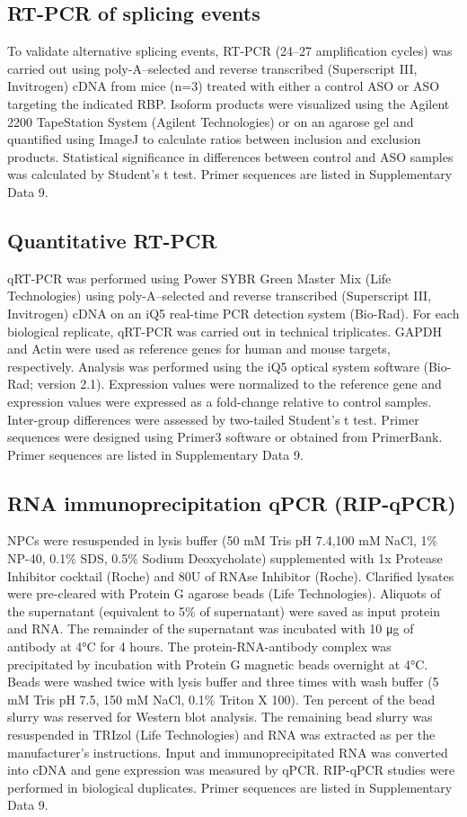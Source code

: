 \subsection{RT-PCR of splicing events}
To validate alternative splicing events, RT-PCR (24–27 amplification cycles) was carried out using poly-A–selected and reverse transcribed (Superscript III, Invitrogen) cDNA from mice (n=3) treated with either a control ASO or ASO targeting the indicated RBP. Isoform products were visualized using the Agilent 2200 TapeStation System (Agilent Technologies) or on an agarose gel and quantified using ImageJ to calculate ratios between inclusion and exclusion products. Statistical significance in differences between control and ASO samples was calculated by Student’s t test. Primer sequences are listed in Supplementary Data 9.

\subsection{Quantitative RT-PCR}
qRT-PCR was performed using Power SYBR Green Master Mix (Life Technologies) using poly-A–selected and reverse transcribed (Superscript III, Invitrogen) cDNA on an iQ5 real-time PCR detection system (Bio-Rad). For each biological replicate, qRT-PCR was carried out in technical triplicates. GAPDH and Actin were used as reference genes for human and mouse targets, respectively. Analysis was performed using the iQ5 optical system software (Bio-Rad; version 2.1). Expression values were normalized to the reference gene and expression values were expressed as a fold-change relative to control samples. Inter-group differences were assessed by two-tailed Student's t test. Primer sequences were designed using Primer3 software\cite{Untergasser2012} or obtained from PrimerBank\cite{Wang2012a}. Primer sequences are listed in Supplementary Data 9.

\subsection{RNA immunoprecipitation qPCR (RIP-qPCR)}
NPCs were resuspended in lysis buffer (50 mM Tris pH 7.4,100 mM NaCl, 1\% NP-40, 0.1\% SDS, 0.5\% Sodium Deoxycholate) supplemented with 1x Protease Inhibitor cocktail (Roche) and 80U of RNAse Inhibitor (Roche). Clarified lysates were pre-cleared with Protein G agarose beads (Life Technologies). Aliquots of the supernatant (equivalent to 5\% of supernatant) were saved as input protein and RNA. The remainder of the supernatant was incubated with 10 μg of antibody at 4°C for 4 hours. The protein-RNA-antibody complex was precipitated by incubation with Protein G magnetic beads overnight at 4°C. Beads were washed twice with lysis buffer and three times with wash buffer (5 mM Tris pH 7.5, 150 mM NaCl, 0.1\% Triton X 100). Ten percent of the bead slurry was reserved for Western blot analysis. The remaining bead slurry was resuspended in TRIzol (Life Technologies) and RNA was extracted as per the manufacturer’s instructions. Input and immunoprecipitated RNA was converted into cDNA and gene expression was measured by qPCR. RIP-qPCR studies were performed in biological duplicates. Primer sequences are listed in Supplementary Data 9.

